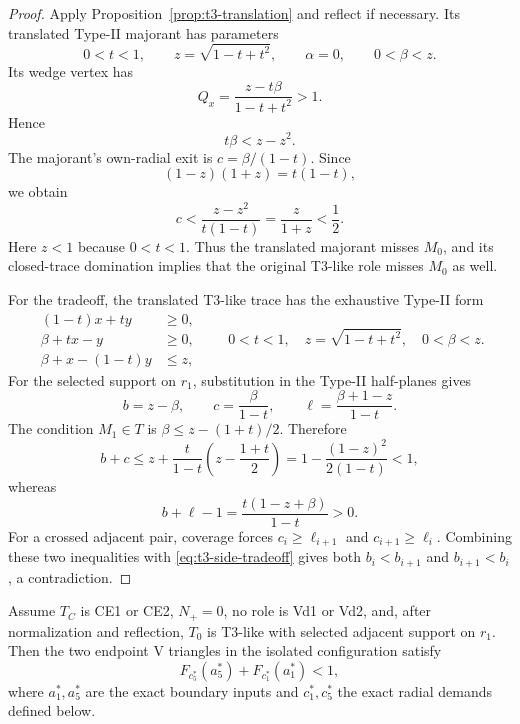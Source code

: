 \begin{proof}
Apply Proposition~\ref{prop:t3-translation} and reflect if necessary.  Its
translated Type-II majorant has parameters
\[
 0<t<1,\qquad z=\sqrt{1-t+t^2},\qquad \alpha=0,\qquad 0<\beta<z.
\]
Its wedge vertex has
\[
 Q_x=\frac{z-t\beta}{1-t+t^2}>1.
\]
Hence
\[
 t\beta<z-z^2.
\]
The majorant's own-radial exit is $c=\beta/(1-t)$.  Since
\[
 (1-z)(1+z)=t(1-t),
\]
we obtain
\[
 c<\frac{z-z^2}{t(1-t)}=\frac{z}{1+z}<\frac12.
\]
Here $z<1$ because $0<t<1$.  Thus the translated majorant misses $M_0$,
and its closed-trace domination
implies that the original T3-like role misses $M_0$ as well.

For the tradeoff, the translated T3-like trace has the exhaustive Type-II
form
\[
 \begin{aligned}
 (1-t)x+ty&\ge0,\\
 \beta+tx-y&\ge0,\\
 \beta+x-(1-t)y&\le z,
 \end{aligned}
 \qquad 0<t<1,\quad z=\sqrt{1-t+t^2},\quad0<\beta<z.
\]
For the selected support on $r_1$, substitution in the Type-II half-planes
gives
\[
 b=z-\beta,\qquad c=\frac{\beta}{1-t},\qquad
 \ell=\frac{\beta+1-z}{1-t}.
\]
The condition $M_1\in T$ is
$\beta\le z-(1+t)/2$.  Therefore
\[
 b+c\le z+\frac{t}{1-t}
 \left(z-\frac{1+t}{2}\right)
 =1-\frac{(1-z)^2}{2(1-t)}<1,
\]
whereas
\[
 b+\ell-1=\frac{t(1-z+\beta)}{1-t}>0.
\]
For a crossed adjacent pair, coverage forces
$c_i\ge\ell_{i+1}$ and $c_{i+1}\ge\ell_i$.  Combining these two
inequalities with \eqref{eq:t3-side-tradeoff} gives both
$b_i<b_{i+1}$ and $b_{i+1}<b_i$, a contradiction.
\end{proof}

\begin{lemma}
\label{lem:407-four-label-loss}
Assume $T_C$ is CE1 or CE2, $N_+=0$, no role is Vd1 or Vd2, and, after
normalization and reflection, $T_0$ is T3-like with selected adjacent
support on $r_1$.  Then the two endpoint V triangles in the isolated configuration
satisfy
\begin{equation}
 F_{c_5^\ast}(a_5^\ast)+F_{c_1^\ast}(a_1^\ast)<1,
 \label{eq:407-loss}
\end{equation}
where $a_1^\ast,a_5^\ast$ are the exact boundary inputs and
$c_1^\ast,c_5^\ast$ the exact radial demands defined below.
\end{lemma}

